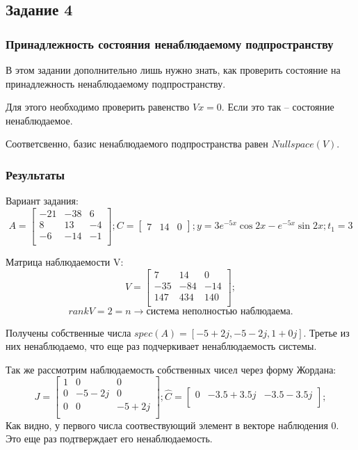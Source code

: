 \subsection{Задание 4}
\subsubsection{Принадлежность состояния ненаблюдаемому подпространству}
В этом задании дополнительно лишь нужно знать, как проверить состояние на принадлежность ненаблюдаемому подпространству.

Для этого необходимо проверить равенство \(Vx = 0\). Если это так -- состояние ненаблюдаемое.

Соответсвенно, базис ненаблюдаемого подпространства равен \(Nullspace(V)\).


\subsubsection{Результаты}
Вариант задания:
\[ A = \begin{bmatrix}
        -21 & -38 & 6 \\
        8 & 13 & -4 \\
        -6 & -14 & -1 \\
        \end{bmatrix}; 
        C = \begin{bmatrix}
                7 & 14 & 0
                \end{bmatrix}; 
        y = 3 e^{-5x}\cos{2x} - e^{-5x}\sin{2x}; 
        t_1 = 3
\]

Матрица наблюдаемости V:
\[ V = \begin{bmatrix}
        7 & 14 & 0 \\
        -35 & -84 & -14 \\
        147 & 434 & 140 \\
        \end{bmatrix};
\]
\[rankV = 2 = n \rightarrow \text{система  неполностью наблюдаема.}\]

Получены собственные числа \(spec(A) = [-5+2j, -5 -2j, 1+0j]\). Третье из них ненаблюдаемо, что еще раз подчеркивает ненаблюдаемость системы.

Так же рассмотрим наблюдаемость собственных чисел через форму Жордана:
\[
        J = \begin{bmatrix}
                1 & 0 & 0 \\
                0 & -5 - 2j & 0 \\
                0 & 0 & -5 + 2j \\
                \end{bmatrix};
        \hat{C} = \begin{bmatrix}
                0 &
                -3.5 + 3.5j &
                -3.5 - 3.5j \\
                \end{bmatrix};
\]
Как видно, у первого числа соотвествующий элемент в векторе наблюдения 0. Это еще раз подтверждает его ненаблюдаемость.

